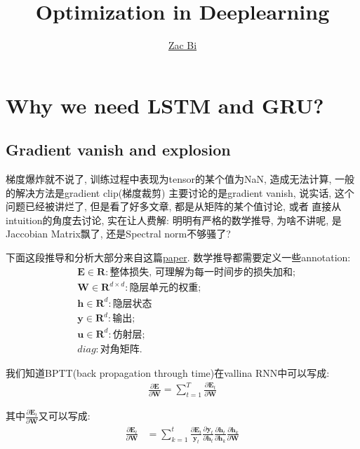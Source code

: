 \documentclass{article}
\begin{document}
\begin{titlepage}
    \title{Optimization in Deeplearning}
    \author{\href{https://github.com/ZacBi}{Zac Bi}}
    \maketitle
    \pagestyle{empty}
\end{titlepage}

\section{Why we need LSTM and GRU?}

\subsection{Gradient vanish and explosion}

梯度爆炸就不说了, 训练过程中表现为tensor的某个值为NaN, 造成无法计算, 一般的解决方法是gradient clip(梯度裁剪)
主要讨论的是gradient vanish, 说实话, 这个问题已经被讲烂了, 但是看了好多文章, 都是从矩阵的某个值讨论, 或者
直接从intuition的角度去讨论, 实在让人费解: 明明有严格的数学推导, 为啥不讲呢, 是Jaccobian Matrix飘了, 还是Spectral norm不够骚了?

下面这段推导和分析大部分来自这篇\href{https://arxiv.org/pdf/1211.5063.pdf}{paper}.
数学推导都需要定义一些annotation:
\begin{align*}
     & \textbf{E} \in \textbf{R}: \text{整体损失, 可理解为每一时间步的损失加和;} \\
     & \textbf{W} \in \textbf{R}^{d \times d}: \text{隐层单元的权重;}            \\
     & \textbf{h} \in \textbf{R}^d: \text{隐层状态}                              \\
     & \textbf{y} \in \textbf{R}^d: \text{输出;}                                 \\
     & \textbf{u} \in \textbf{R}^d: \text{仿射层;}                               \\
     & diag: \text{对角矩阵.}
\end{align*}

我们知道BPTT(back propagation through time)在vallina RNN中可以写成:
\begin{align}
    \frac{\partial \textbf{E}}{\partial \textbf{W}} = \sum_{t=1}^{T} \frac{\partial \textbf{E}_t}{\partial \textbf{W}}
\end{align}

其中$\frac{\partial \textbf{E}_t}{\partial \textbf{W}}$又可以写成:
\begin{align}
    \frac{\partial \textbf{E}_t}{\partial \textbf{W}} & = \sum_{k=1}^{t} \frac{\partial \textbf{E}_t}{\textbf{y}_t}
    \frac{\partial \textbf{y}_t}{\partial \textbf{h}_t} \frac{\partial \textbf{h}_t}{\partial \textbf{h}_k}
    \frac{\partial \textbf{h}_k}{\partial \textbf{W}}
\end{align}
\end{document}
